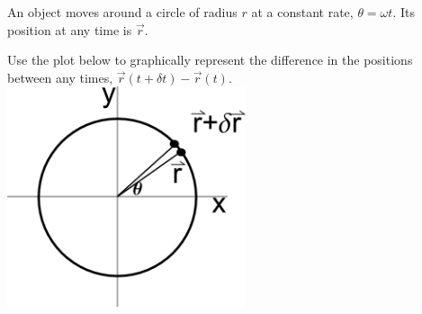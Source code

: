 \begin{problem}
\item An object moves around a circle of radius $r$  at a constant
  rate, $\theta=\omega t$. Its position at any time is $\vec{r}$.

  \begin{subproblem}
  \item Use the plot below to graphically represent the difference in
    the positions between any times, $\vec{r}(t+\delta
    t)-\vec{r}(t)$. \\
    \includegraphics[width=7cm]{ink/week12/circularAcceleration}


\end{subproblem}
\end{problem}
